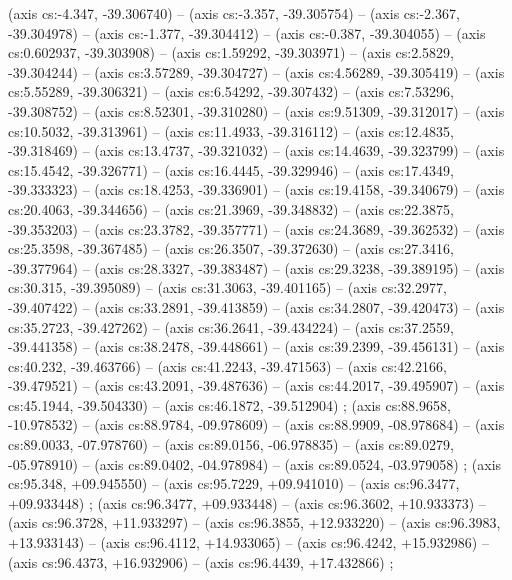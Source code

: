     (axis cs:-4.347,    -39.306740) --  (axis cs:-3.357,    -39.305754) --  (axis cs:-2.367,    -39.304978) --  (axis cs:-1.377,    -39.304412) --  (axis cs:-0.387,    -39.304055) --  (axis cs:0.602937,    -39.303908) --  (axis cs:1.59292,    -39.303971) --  (axis cs:2.5829,    -39.304244) --  (axis cs:3.57289,    -39.304727) --  (axis cs:4.56289,    -39.305419) --  (axis cs:5.55289,    -39.306321) --  (axis cs:6.54292,    -39.307432) --  (axis cs:7.53296,    -39.308752) --  (axis cs:8.52301,    -39.310280) --  (axis cs:9.51309,    -39.312017) --  (axis cs:10.5032,    -39.313961) --  (axis cs:11.4933,    -39.316112) --  (axis cs:12.4835,    -39.318469) --  (axis cs:13.4737,    -39.321032) --  (axis cs:14.4639,    -39.323799) --  (axis cs:15.4542,    -39.326771) --  (axis cs:16.4445,    -39.329946) --  (axis cs:17.4349,    -39.333323) --  (axis cs:18.4253,    -39.336901) --  (axis cs:19.4158,    -39.340679) --  (axis cs:20.4063,    -39.344656) --  (axis cs:21.3969,    -39.348832) --  (axis cs:22.3875,    -39.353203) --  (axis cs:23.3782,    -39.357771) --  (axis cs:24.3689,    -39.362532) --  (axis cs:25.3598,    -39.367485) --  (axis cs:26.3507,    -39.372630) --  (axis cs:27.3416,    -39.377964) --  (axis cs:28.3327,    -39.383487) --  (axis cs:29.3238,    -39.389195) --  (axis cs:30.315,    -39.395089) --  (axis cs:31.3063,    -39.401165) --  (axis cs:32.2977,    -39.407422) --  (axis cs:33.2891,    -39.413859) --  (axis cs:34.2807,    -39.420473) --  (axis cs:35.2723,    -39.427262) --  (axis cs:36.2641,    -39.434224) --  (axis cs:37.2559,    -39.441358) --  (axis cs:38.2478,    -39.448661) --  (axis cs:39.2399,    -39.456131) --  (axis cs:40.232,    -39.463766) --  (axis cs:41.2243,    -39.471563) --  (axis cs:42.2166,    -39.479521) --  (axis cs:43.2091,    -39.487636) --  (axis cs:44.2017,    -39.495907) --  (axis cs:45.1944,    -39.504330) --  (axis cs:46.1872,    -39.512904) ;
    (axis cs:88.9658,    -10.978532) --  (axis cs:88.9784,    -09.978609) --  (axis cs:88.9909,    -08.978684) --  (axis cs:89.0033,    -07.978760) --  (axis cs:89.0156,    -06.978835) --  (axis cs:89.0279,    -05.978910) --  (axis cs:89.0402,    -04.978984) --  (axis cs:89.0524,    -03.979058) ;
    (axis cs:95.348,    +09.945550) --  (axis cs:95.7229,    +09.941010) --  (axis cs:96.3477,    +09.933448) ;
    (axis cs:96.3477,    +09.933448) --  (axis cs:96.3602,    +10.933373) --  (axis cs:96.3728,    +11.933297) --  (axis cs:96.3855,    +12.933220) --  (axis cs:96.3983,    +13.933143) --  (axis cs:96.4112,    +14.933065) --  (axis cs:96.4242,    +15.932986) --  (axis cs:96.4373,    +16.932906) --  (axis cs:96.4439,    +17.432866) ;
